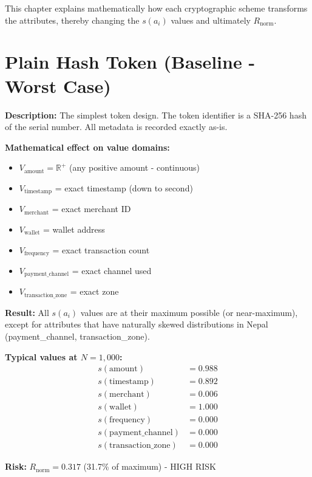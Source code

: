 \documentclass[12pt,a4paper,oneside,openany]{report}
\begin{document}
This chapter explains mathematically how each cryptographic scheme transforms the attributes, thereby changing the $s(a_i)$ values and ultimately $R_{\mathrm{norm}}$.

\section{Plain Hash Token (Baseline - Worst Case)}
\label{sec:plain}

\textbf{Description:} The simplest token design. The token identifier is a SHA-256 hash of the serial number. All metadata is recorded exactly as-is.

\textbf{Mathematical effect on value domains:}
\begin{itemize}
    \item $V_{\text{amount}} = \mathbb{R}^+$ (any positive amount - continuous)
    \item $V_{\text{timestamp}}$ = exact timestamp (down to second)
    \item $V_{\text{merchant}}$ = exact merchant ID
    \item $V_{\text{wallet}}$ = wallet address
    \item $V_{\text{frequency}}$ = exact transaction count
    \item $V_{\text{payment\_channel}}$ = exact channel used
    \item $V_{\text{transaction\_zone}}$ = exact zone
\end{itemize}

\textbf{Result:} All $s(a_i)$ values are at their maximum possible (or near-maximum), except for attributes that have naturally skewed distributions in Nepal (payment\_channel, transaction\_zone).

\textbf{Typical values at $N = 1,000$:}
\begin{align*}
s(\text{amount}) &= 0.988 \\
s(\text{timestamp}) &= 0.892 \\
s(\text{merchant}) &= 0.006 \\
s(\text{wallet}) &= 1.000 \\
s(\text{frequency}) &= 0.000 \\
s(\text{payment\_channel}) &= 0.000 \\
s(\text{transaction\_zone}) &= 0.000
\end{align*}

\textbf{Risk:} $R_{\mathrm{norm}} = 0.317$ (31.7\% of maximum) - HIGH RISK
\end{document}
